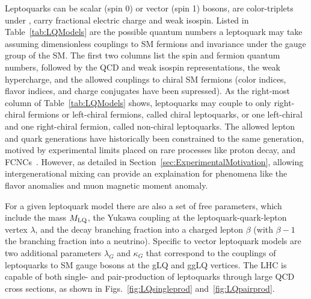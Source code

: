 

Leptoquarks can be scalar (spin 0) or vector (spin 1) bosons, are color-triplets under \SUthreeC, carry fractional electric charge and weak isospin. Listed in Table~\ref{tab:LQModels} are the possible quantum numbers a leptoquark may take assuming dimensionless couplings to SM fermions and invariance under the gauge group of the SM. The first two columns list the spin and fermion quantum numbers, followed by the QCD and weak isospin representations, the weak hypercharge, and the allowed couplings to chiral SM fermions (color indices, flavor indices, and charge conjugates have been supressed). As the right-most column of Table~\ref{tab:LQModels} shows, leptoquarks may couple to only right-chiral fermions or left-chiral fermions, called chiral leptoquarks, or one left-chiral and one right-chiral fermion, called non-chiral leptoquarks. The allowed lepton and quark generations have historically been constrained to the same generation, motived by experimental limits placed on rare processes like proton decay, and FCNCs~\cite{FCNC}. However, as detailed in Section~\ref{sec:ExperimentalMotivation}, allowing intergenerational mixing can provide an explaination for phenomena like the flavor anomalies and muon magnetic moment anomaly. 

For a given leptoquark model there are also a set of free parameters, which include the mass $M_{\mathrm{LQ}}$, the Yukawa coupling at the leptoquark-quark-lepton vertex $\lambda$, and the decay branching fraction into a charged lepton $\beta$ (with $\beta-1$ the branching fraction into a neutrino). Specific to vector leptoquark models are two additional parameters $\lambda_G$ and $\kappa_G$ that correspond to the couplings of leptoquarks to SM gauge bosons at the gLQ and ggLQ vertices. The LHC is capable of both single- and pair-production of leptoquarks through large QCD cross sections, as shown in Figs.~\ref{fig:LQsingleprod} and~\ref{fig:LQpairprod}. 

